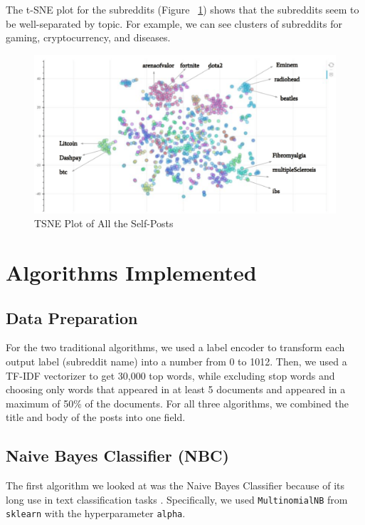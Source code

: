 \documentclass{sig-alternate-05-2015}
\begin{document}
The t-SNE\cite{tsne} plot for the subreddits (Figure ~\ref{fig:tsnePlot}) shows that the subreddits seem to be well-separated by topic. For example, we can see clusters of subreddits for gaming, cryptocurrency, and diseases.

\begin{figure}[H]
\centering
\includegraphics[width=\linewidth]{plots/tsne.png}
\caption{TSNE Plot of All the Self-Posts}
\label{fig:tsnePlot}
\end{figure}

\section{Algorithms Implemented}

\subsection{Data Preparation}

For the two traditional algorithms, we used a label encoder to transform each output label (subreddit name) into a number from 0 to 1012. Then, we used a TF-IDF vectorizer to get 30,000 top words, while excluding stop words and choosing only words that appeared in at least 5 documents and appeared in a maximum of 50\% of the documents. For all three algorithms, we combined the title and body of the posts into one field.

\subsection{Naive Bayes Classifier (NBC)}

The first algorithm we looked at was the Naive Bayes Classifier because of its long use in text classification tasks \cite{rennie2001:improving}. Specifically, we used \verb+MultinomialNB+ from \verb+sklearn+ with the hyperparameter \verb+alpha+.
\end{document}
